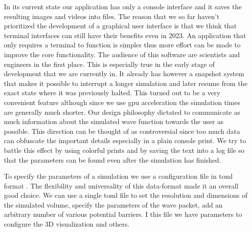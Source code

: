 In its current state our application has only a console interface and it saves the resulting images and videos into files.
The reason that we so far haven't prioritized the development of a graphical user interface is that we think that terminal interfaces can still have their benefits even in 2023.
An application that only requires a terminal to function is simpler thus more effort can be made to improve the core functionality.
The audience of this software are scientists and engineers in the first place.
This is especially true in the early stage of development that we are currently in.
It already has however a snapshot system that makes it possible to interrupt a longer simulation and later resume from the exact state where it was previously halted.
This turned out to be a very convenient feature although since we use \acrshort{gpu} acceleration the simulation times are generally much shorter.
Our design philosophy dictated to communicate as much information about the simulated wave function towards the user as possible.
This direction can be thought of as controversial since too much data can obfuscate the important details especially in a plain console print.
We try to battle this effect by using colorful prints and by saving the text into a log file so that the parameters can be found even after the simulation has finished.

To specify the parameters of a simulation we use a configuration file in \acrfull{toml} format \cite{toml}.
The flexibility and universality of this data-format made it an overall good choice.
We can use a single \acrshort{toml} file to set the resolution and dimensions of the simulated volume, specify the parameters of the wave packet, add an arbitrary number of various potential barriers.
I this file we have parameters to configure the 3D visualization and others.

